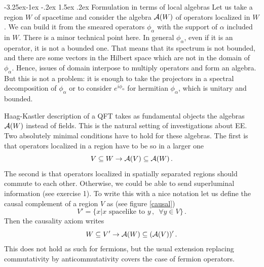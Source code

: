 \documentclass[11pt,a4paper]{article}
\makeatletter
\renewcommand\subsection{\@startsection{subsection}{2}{\z@}%
                                   {-3.25ex\@plus -1ex \@minus -.2ex}%
                                     {1.5ex \@plus .2ex}%
                                     {\normalfont\bfseries}}
\numberwithin{equation}{section}
\newcommand{\be}{\begin{equation}}
\newcommand{\ee}{\end{equation}}
\makeatother
\begin{document}
\subsection{Formulation in terms of local algebras}
Let us take a region $W$ of spacetime and consider the algebra ${\cal A}(W)$ of operators localized in $W$. We can build it from the smeared operators $\phi_\alpha$ with the support of $\alpha$ included in $W$. There is a minor technical point here. In general $\phi_\alpha$, even if it is an operator, it is not a bounded one. That means that its spectrum is not bounded, and there are some vectors in the Hilbert space which are not in the domain of $\phi_\alpha$. Hence, issues of domain interpose to multiply operators and form an algebra. But this is not a problem: it is enough to take the projectors in a spectral decomposition of $\phi_\alpha$ or to consider $e^{i \phi_\alpha}$ for hermitian $\phi_\alpha$, which is unitary and bounded. 

 

Haag-Kastler description of a QFT takes as fundamental objects the algebras ${\cal A}(W)$ instead of fields. This is the natural setting of investigations about EE. Two absolutely minimal conditions have to hold for these algebras. The first is that operators localized in a region have to be so in a larger one   
\be
V\subseteq W\rightarrow  {\cal A}(V) \subseteq {\cal A}(W)\,.
\ee
The second is that operators localized in spatially separated regions should commute to each other. Otherwise, we could be able to send superluminal information (see exercise 1). To write this with a nice notation let us define the causal complement of a region $V$ as (see figure \ref{causal})
\be
V'=\{x | x \,\,\textrm{spacelike to }y\,, \,\,\, \forall y \in V\}\,.  
\ee
Then the causality axiom writes 
\be
W\subseteq V'\rightarrow {\cal A}(W)\subseteq ({\cal A}(V))'\,.
\ee
This does not hold as such for fermions, but the usual extension replacing commutativity by anticommutativity covers the case of fermion operators.  
\end{document}
